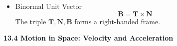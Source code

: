 \documentclass[12pt]{article}
\renewcommand{\vec}[1]{\mathbf{#1}}
\newcommand{\<}{\left<}
\renewcommand{\>}{\right>}
\begin{document}
\begin{itemize}
    
      
    
    



  
    \item Binormal Unit Vector
      \[\vec{B} = \vec{T} \times \vec{N}\]
      The triple $\vec{T},\vec{N},\vec{B}$ forms a right-handed frame.

  \end{itemize}

\newpage

\centerline{\bf 13.4 Motion in Space: Velocity and Acceleration}
\end{document}
